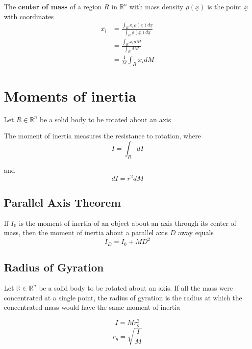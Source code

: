 \begin{framed}
   The \textbf{center of mass} of a region $R$ in $ \mathbb{R}^n$ with mass density $ \rho ( \underline{x})$ is the point $ \overline{ \underline{x}}$ with coordinates
   \begin{align*}
      \overline{x_i} &= \frac{
         \int_R x_i \rho( \underline{x}) d \underline{x} 
      }{
         \int_R \rho ( \underline{x}) d \underline{x}
      } \\
      &= \frac{
         \int_R x_i dM
      }{
         \int_R dM
      } \\
      &= \frac{1}{M} \int_R x_i dM
   \end{align*}
\end{framed}

\section{Moments of inertia}

\begin{framed}
   Let $R \in \mathbb{R}^n$ be a solid body to be rotated about an axis

   The moment of inertia measures the resistance to rotation, where
   \[
     I = \int_R dI
   \] 

   and \[
     dI = r^2 dM
   \] 
\end{framed}

\subsection{Parallel Axis Theorem}

\begin{framed}
   If $I_0$ is the moment of inertia of an object about an axis through its center of mass, then the moment of inertia about a parallel axis $D$ away equals
   \[
     I_D = I_0 + MD^2
   \] 
\end{framed}

\subsection{Radius of Gyration}

\begin{framed}
   Let  $ \mathbb{R} \in \mathbb{R}^n$ be a solid body to be rotated about an axis. If all the mass were concentrated at a single point, the radius of gyration is the radius at which the concentrated mass would have the same moment of inertia

   \[
     I = M r_g^2
   \] 
   \[
      r_g = \sqrt{ \frac{I}{M}}
   \] 
  
\end{framed}

